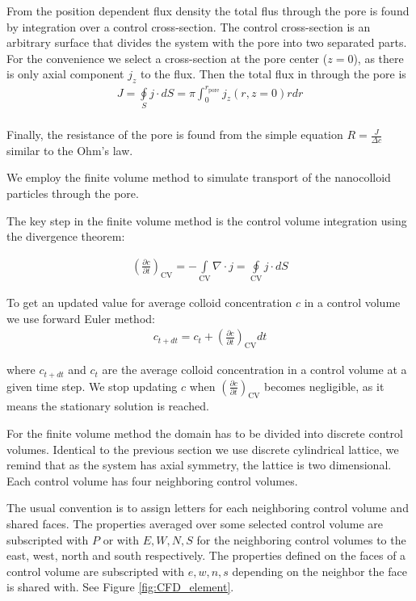 \documentclass[10pt, a4paper]{article}
\begin{document}
\begin{multicols}{2}
From the position dependent flux density the total flus through the pore is found by integration over a control cross-section.
The control cross-section is an arbitrary surface that divides the system with the pore into two separated parts. 
For the convenience we select a cross-section at the pore center ($z=0$), as there is only axial component $j_z$ to the flux.
Then the total flux in through the pore is
\begin{eqnarray}
    J = \oint\limits_{S} j \cdot dS = \pi \int_0^{r_\textrm{pore}} j_z(r,z=0) r dr
    \\
\end{eqnarray}

Finally, the resistance of the pore is found from the simple equation $R = \frac{J}{\Delta c}$ similar to the Ohm's law.

We employ the finite volume method to simulate transport of the nanocolloid particles through the pore.

The key step in the finite volume method is the control volume integration using the divergence theorem:

\begin{eqnarray}
    \label{eq:CFD_integration_1}
    \left(\frac{\partial c}{\partial t}\right)_{\textrm{CV}}  = -\int\limits_{\textrm{CV}} \nabla \cdot j = \oint\limits_{\textrm{CV}} j \cdot dS
\end{eqnarray}

To get an updated value for average colloid concentration $c$ in a control volume we use forward Euler method:
\begin{eqnarray}
    c_{t+dt} = c_{t} +  \left(\frac{\partial c}{\partial t}\right)_{\textrm{CV}} dt 
\end{eqnarray}

where $c_{t+dt}$ and $c_{t}$ are the average colloid concentration in a control volume at a given time step.
We stop updating $c$ when $\left(\frac{\partial c}{\partial t}\right)_{\textrm{CV}}$ becomes negligible, as it means the stationary solution is reached.

For the finite volume method the domain has to be divided into discrete control volumes.
Identical to the previous section we use discrete cylindrical lattice, we remind that as the system has axial symmetry, the lattice is two dimensional.
Each control volume has four neighboring control volumes.

The usual convention is to assign letters for each neighboring control volume and shared faces. The properties averaged over some selected control volume are subscripted with $P$ or with $E, W, N, S$ for the neighboring control volumes to the east, west, north and south respectively. The properties defined on the faces of a control volume are subscripted with $e, w, n, s$ depending on the neighbor the face is shared with. See Figure \ref{fig:CFD_element}.


\end{multicols}
\end{document}

